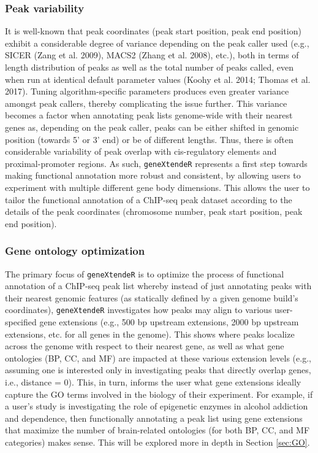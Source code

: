 \documentclass[12pt]{article}
\begin{document}
\subsubsection{Peak variability}
It is well-known that peak coordinates (peak start position, peak end position) exhibit a considerable degree of variance depending on the peak caller used (e.g., SICER (Zang et al. 2009), MACS2 (Zhang et al. 2008), etc.), both in terms of length distribution of peaks as well as the total number of peaks called, even when run at identical default parameter values (Koohy et al. 2014; Thomas et al. 2017).  Tuning algorithm-specific parameters produces even greater variance amongst peak callers, thereby complicating the issue further.  This variance becomes a factor when annotating peak lists genome-wide with their nearest genes as, depending on the peak caller, peaks can be either shifted in genomic position (towards 5' or 3' end) or be of different lengths.  Thus, there is often considerable variability of peak overlap with cis-regulatory elements and proximal-promoter regions.  As such, \texttt{geneXtendeR} represents a first step towards making functional annotation more robust and consistent, by allowing users to experiment with multiple different gene body dimensions.  This allows the user to tailor the functional annotation of a ChIP-seq peak dataset according to the details of the peak coordinates (chromosome number, peak start position, peak end position).  

\subsubsection{Gene ontology optimization}
The primary focus of \texttt{geneXtendeR} is to optimize the process of functional annotation of a ChIP-seq peak list whereby instead of just annotating peaks with their nearest genomic features (as statically defined by a given genome build's coordinates), \texttt{geneXtendeR} investigates how peaks may align to various user-specified gene extensions (e.g., 500 bp upstream extensions, 2000 bp upstream extensions, etc. for all genes in the genome).  This shows where peaks localize across the genome with respect to their nearest gene, as well as what gene ontologies (BP, CC, and MF) are impacted at these various extension levels (e.g., assuming one is interested only in investigating peaks that directly overlap genes, i.e., distance = 0).  This, in turn, informs the user what gene extensions ideally capture the GO terms involved in the biology of their experiment.  For example, if a user's study is investigating the role of epigenetic enzymes in alcohol addiction and dependence, then functionally annotating a peak list using gene extensions that maximize the number of brain-related ontologies (for both BP, CC, and MF categories) makes sense.  This will be explored more in depth in Section \ref{sec:GO}.
\end{document}
